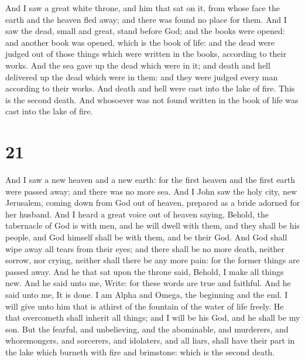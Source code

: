  And I saw a great white throne, and him that sat on it,
from whose face the earth and the heaven fled away; and there was found
no place for them.  And I saw the dead, small and great,
stand before God; and the books were opened: and another book was
opened, which is the book of life: and the dead were judged out of those
things which were written in the books, according to their works.
 And the sea gave up the dead which were in it; and death
and hell delivered up the dead which were in them: and they were judged
every man according to their works.  And death and hell
were cast into the lake of fire. This is the second death.
 And whosoever was not found written in the book of life
was cast into the lake of fire.

\hypertarget{section-20}{%
\section{21}\label{section-20}}

 And I saw a new heaven and a new earth: for the first
heaven and the first earth were passed away; and there was no more sea.
 And I John saw the holy city, new Jerusalem, coming down
from God out of heaven, prepared as a bride adorned for her husband.
 And I heard a great voice out of heaven saying, Behold,
the tabernacle of God is with men, and he will dwell with them, and they
shall be his people, and God himself shall be with them, and be their
God.  And God shall wipe away all tears from their eyes;
and there shall be no more death, neither sorrow, nor crying, neither
shall there be any more pain: for the former things are passed away.
 And he that sat upon the throne said, Behold, I make all
things new. And he said unto me, Write: for these words are true and
faithful.  And he said unto me, It is done. I am Alpha and
Omega, the beginning and the end. I will give unto him that is athirst
of the fountain of the water of life freely.  He that
overcometh shall inherit all things; and I will be his God, and he shall
be my son.  But the fearful, and unbelieving, and the
abominable, and murderers, and whoremongers, and sorcerers, and
idolaters, and all liars, shall have their part in the lake which
burneth with fire and brimstone: which is the second death.

